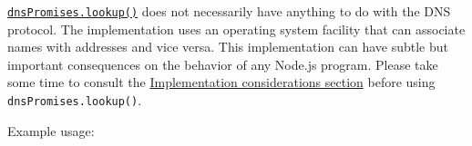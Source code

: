 \hyperref[dnspromiseslookuphostname-options]{\texttt{dnsPromises.lookup()}}
does not necessarily have anything to do with the DNS protocol. The
implementation uses an operating system facility that can associate
names with addresses and vice versa. This implementation can have subtle
but important consequences on the behavior of any Node.js program.
Please take some time to consult the
\hyperref[implementation-considerations]{Implementation considerations
section} before using \texttt{dnsPromises.lookup()}.

Example usage:

\begin{Shaded}
\begin{Highlighting}[]
\OperatorTok{=} \NormalTok{(}\NormalTok{)}\OperatorTok{;}
\OperatorTok{=}\OperatorTok{;}
\OperatorTok{=}\NormalTok{ \{}
  \OperatorTok{:} \OperatorTok{,}
  \OperatorTok{:} \OperatorTok{|}\OperatorTok{,}
\NormalTok{\}}\OperatorTok{;}

\NormalTok{(}\OperatorTok{,}\KeywordTok{=\textgreater{}}\NormalTok{ \{}
  \NormalTok{(}\OperatorTok{,}\OperatorTok{,}\NormalTok{)}\OperatorTok{;}
\NormalTok{\})}\OperatorTok{;}

 \OperatorTok{=} \OperatorTok{;}
\NormalTok{(}\OperatorTok{,}\KeywordTok{=\textgreater{}}\NormalTok{ \{}
  \NormalTok{(}\OperatorTok{,}\OperatorTok{;}
\NormalTok{\})}\OperatorTok{;}
\end{Highlighting}
\end{Shaded}

